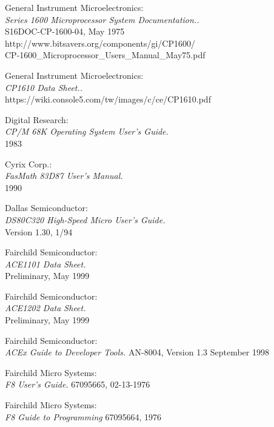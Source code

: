  General Instrument Microelectronics: \\
                 {\em Series 1600 Microprocessor System Documentation..\/} \\
                 S16DOC-CP-1600-04, May 1975 \\
                 http://www.bitsavers.org/components/gi/CP1600/ \\
                 CP-1600\_Microprocessor\_Users\_Manual\_May75.pdf

 General Instrument Microelectronics: \\
                 {\em CP1610 Data Sheet..\/} \\
                 https://wiki.console5.com/tw/images/c/ce/CP1610.pdf

 Digital Research: \\
                 {\em CP/M 68K Operating System User's Guide.\/} \\
        	 1983

 Cyrix Corp.: \\
                {\em FasMath 83D87 User's Manual.\/} \\
		1990

 Dallas Semiconductor: \\
		    {\em DS80C320 High-Speed Micro User's Guide.\/} \\
                    Version 1.30, 1/94

 Fairchild Semiconductor: \\
                   {\em ACE1101 Data Sheet.\/} \\
                   Preliminary, May 1999

 Fairchild Semiconductor: \\
                   {\em ACE1202 Data Sheet.\/} \\
                   Preliminary, May 1999

 Fairchild Semiconductor: \\
                   {\em ACEx Guide to Developer Tools.\/}
                   AN-8004, Version 1.3 September 1998

 Fairchild Micro Systems: \\
                   {\em F8 User's Guide.\/}
                   67095665, 02-13-1976                   

 Fairchild Micro Systems: \\
                   {\em F8 Guide to Programming\/}
                   67095664, 1976

